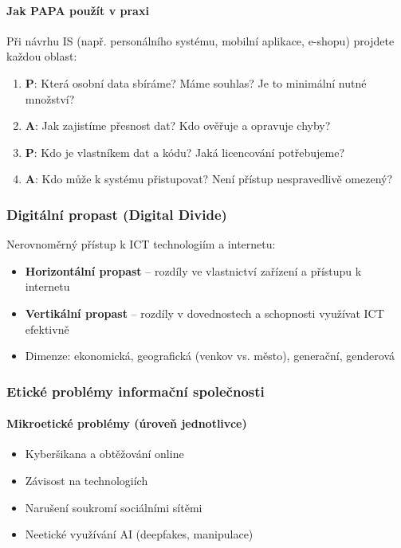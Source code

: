 \paragraph{Jak PAPA použít v praxi}
Při návrhu IS (např. personálního systému, mobilní aplikace, e-shopu) projdete každou oblast:
\begin{enumerate}
  \item \textbf{P}: Která osobní data sbíráme? Máme souhlas? Je to minimální nutné množství?
  \item \textbf{A}: Jak zajistíme přesnost dat? Kdo ověřuje a opravuje chyby?
  \item \textbf{P}: Kdo je vlastníkem dat a kódu? Jaká licencování potřebujeme?
  \item \textbf{A}: Kdo může k systému přistupovat? Není přístup nespravedlivě omezený?
\end{enumerate}

\subsubsection{Digitální propast (Digital Divide)}

Nerovnoměrný přístup k ICT technologiím a internetu:
\begin{itemize}
  \item \textbf{Horizontální propast} -- rozdíly ve vlastnictví zařízení a přístupu k internetu
  \item \textbf{Vertikální propast} -- rozdíly v dovednostech a schopnosti využívat ICT efektivně
  \item Dimenze: ekonomická, geografická (venkov vs. město), generační, genderová
\end{itemize}

\subsubsection{Etické problémy informační společnosti}

\paragraph{Mikroetické problémy (úroveň jednotlivce)}
\begin{itemize}
  \item Kyberšikana a obtěžování online
  \item Závisost na technologiích
  \item Narušení soukromí sociálními sítěmi
  \item Neetické využívání AI (deepfakes, manipulace)
\end{itemize}


